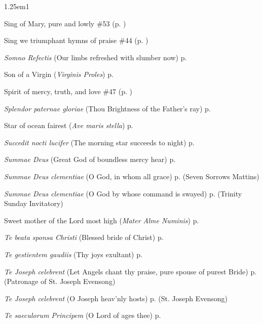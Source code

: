 \begin{hangparas}{1.25em}{1}
\par\noindent
Sing of Mary, pure and lowly \dotfill \#53 (p. \pageref{Hymn53})
\par\noindent
Sing we triumphant hymns of praise \dotfill \#44 (p. \pageref{Hymn44})
\par\noindent
\textit{Somno Refectis} (Our limbs refreshed with slumber now) \dotfill p. \pageref{MondayInvitatory}
\par\noindent
Son of a Virgin (\textit{Virginis Proles}) \dotfill p. \pageref{VirginInvitatory}
\par\noindent
Spirit of mercy, truth, and love \dotfill \#47 (p. \pageref{Hymn47})
\par\noindent
\textit{Splendor paternae gloriae} (Thou Brightness of the Father's ray) \dotfill p. \pageref{MondayMattinsWinter}
\par\noindent
Star of ocean fairest (\textit{Ave maris stella}) \dotfill p. \pageref{BVMEvensong}
\par\noindent
\textit{Succedit nocti lucifer} (The morning star succeeds to night) \dotfill p. \pageref{AnneMattins}
\par\noindent
\textit{Summae Deus} (Great God of boundless mercy hear) \dotfill p. \pageref{SaturdayInvitatory}
\par\noindent
\textit{Summae Deus clementiae} (O God, in whom all grace) \dotfill p. \pageref{SevenSorrowsMattins} (Seven Sorrows Mattins)
\par\noindent
\textit{Summae Deus clementiae} (O God by whose command is swayed) \dotfill p. \pageref{TrinityInvitatory} (Trinity Sunday Invitatory)
\par\noindent
Sweet mother of the Lord most high (\textit{Mater Alme Numinis}) \dotfill p. \pageref{MotherhoodMattins}
\par\noindent
\textit{Te beata sponsa Christi} (Blessed bride of Christ) \dotfill p. \pageref{ScholasticaEvensong}
\par\noindent
\textit{Te gestientem gaudiis} (Thy joys exultant) \dotfill p. \pageref{HolyRosaryIIEvensong}
\par\noindent
\textit{Te Joseph celebrent} (Let Angels chant thy praise, pure spouse of purest Bride) \dotfill p. \pageref{PatronageEvensong} (Patronage of St. Joseph Evensong)
\par\noindent
\textit{Te Joseph celebrent} (O Joseph heav'nly hosts) \dotfill p. \pageref{JosephEvensong} (St. Joseph Evensong)
\par\noindent
\textit{Te saeculorum Principem} (O Lord of ages thee) \dotfill p. \pageref{ChristTheKingEvensong}

\end{hangparas}
